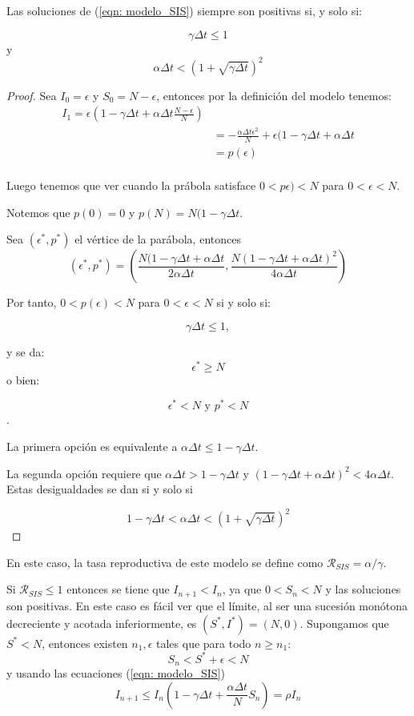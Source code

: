\begin{proposition}
Las soluciones de (\ref{eqn: modelo_SIS}) siempre son positivas si, y solo si:

$$\gamma \Delta t \leq 1 $$ y $$\alpha\Delta t< \left( 1+\sqrt{\gamma \Delta t} \right)^2$$

\end{proposition}
\begin{proof}
Sea $I_0=\epsilon$ y $S_0=N-\epsilon$, entonces por la definición del modelo tenemos:
\begin{equation}
\begin{aligned}
I_1=\epsilon\left(1-\gamma\Delta t+\alpha\Delta t\frac{N-\epsilon}{N}\right) \\
& = -\frac{\alpha\Delta t \epsilon^2}{N} + \epsilon(1-\gamma\Delta t+\alpha\Delta t \\
& = p(\epsilon) \\
\end{aligned}
\end{equation}

Luego tenemos que ver cuando la prábola satisface $0<p\epsilon)<N$ para $0<\epsilon<N$.

Notemos que $p(0)=0$ y $p(N)=N(1-\gamma\Delta t$.

Sea $(\epsilon^*, p^*)$ el vértice de la parábola, entonces 
$$(\epsilon^*, p^*) = \left(\frac{N(1-\gamma\Delta t+\alpha\Delta t}{2\alpha\Delta t}, \frac{N(1-\gamma\Delta t+\alpha\Delta t)^2}{4\alpha\Delta t}\right)$$

Por tanto, $0<p(\epsilon )<N$ para $0<\epsilon <N$ si y solo si:

$$\gamma\Delta t \leq 1,$$

y se da:
$$\epsilon^* \geq N$$
o bien:

$$\epsilon^*<N \text{  y  } p^*<N$$.

La primera opción es equivalente a $\alpha\Delta t \leq 1-\gamma\Delta t$.

La segunda opción requiere que $\alpha\Delta t > 1-\gamma\Delta t$ y $(1-\gamma\Delta t+\alpha\Delta t)^2<4\alpha\Delta t$. Estas desigualdades se dan si y solo si

$$1-\gamma\Delta t < \alpha \Delta t < \left( 1+\sqrt{\gamma \Delta t} \right)^2$$

\end{proof}

En este caso, la tasa reproductiva de este modelo se define como $\mathcal{R}_{SIS}=\alpha /\gamma$.

Si $\mathcal{R}_{SIS}\leq 1$ entonces se tiene que $I_{n+1} < I_n$, ya que $0<S_n<N$ y las soluciones son positivas. En este caso es fácil ver que el límite, al ser una sucesión monótona decreciente y acotada inferiormente, es $(S^*,I^*)=(N,0)$. Supongamos que $S^*<N$, entonces existen $n_1, \epsilon$ tales que para todo $n \geq n_1$:
$$S_n<S^*+\epsilon < N$$
y usando las ecuaciones (\ref{eqn: modelo_SIS})
$$I_{n+1} \leq I_n \left( 1-\gamma \Delta t + \frac{\alpha\Delta t}{N} S_n \right) = \rho I_n$$

